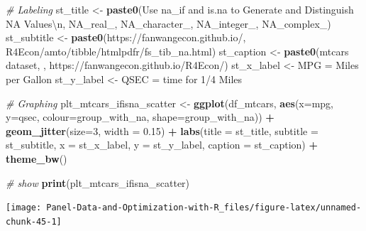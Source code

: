 \documentclass[
]{book}
\newenvironment{Shaded}{\begin{snugshade}}{\end{snugshade}}
\newcommand{\CharTok}[1]{\textcolor[rgb]{0.31,0.60,0.02}{#1}}
\newcommand{\CommentTok}[1]{\textcolor[rgb]{0.56,0.35,0.01}{\textit{#1}}}
\newcommand{\DataTypeTok}[1]{\textcolor[rgb]{0.13,0.29,0.53}{#1}}
\newcommand{\DecValTok}[1]{\textcolor[rgb]{0.00,0.00,0.81}{#1}}
\newcommand{\FloatTok}[1]{\textcolor[rgb]{0.00,0.00,0.81}{#1}}
\newcommand{\KeywordTok}[1]{\textcolor[rgb]{0.13,0.29,0.53}{\textbf{#1}}}
\newcommand{\NormalTok}[1]{#1}
\newcommand{\OperatorTok}[1]{\textcolor[rgb]{0.81,0.36,0.00}{\textbf{#1}}}
\newcommand{\StringTok}[1]{\textcolor[rgb]{0.31,0.60,0.02}{#1}}
\begin{document}
\begin{Shaded}
\begin{Highlighting}[]
\CommentTok{\# Labeling}
\NormalTok{st\_title \textless{}{-}}\StringTok{ }\KeywordTok{paste0}\NormalTok{(}\StringTok{\textquotesingle{}Use na\_if and is.na to Generate and Distinguish NA Values}\CharTok{\textbackslash{}n}\StringTok{\textquotesingle{}}\NormalTok{,}
                   \StringTok{\textquotesingle{}NA\_real\_, NA\_character\_, NA\_integer\_, NA\_complex\_\textquotesingle{}}\NormalTok{)}
\NormalTok{st\_subtitle \textless{}{-}}\StringTok{ }\KeywordTok{paste0}\NormalTok{(}\StringTok{\textquotesingle{}https://fanwangecon.github.io/\textquotesingle{}}\NormalTok{,}
                      \StringTok{\textquotesingle{}R4Econ/amto/tibble/htmlpdfr/fs\_tib\_na.html\textquotesingle{}}\NormalTok{)}
\NormalTok{st\_caption \textless{}{-}}\StringTok{ }\KeywordTok{paste0}\NormalTok{(}\StringTok{\textquotesingle{}mtcars dataset, \textquotesingle{}}\NormalTok{,}
                     \StringTok{\textquotesingle{}https://fanwangecon.github.io/R4Econ/\textquotesingle{}}\NormalTok{)}
\NormalTok{st\_x\_label \textless{}{-}}\StringTok{ \textquotesingle{}MPG = Miles per Gallon\textquotesingle{}}
\NormalTok{st\_y\_label \textless{}{-}}\StringTok{ \textquotesingle{}QSEC = time for 1/4 Miles\textquotesingle{}}

\CommentTok{\# Graphing}
\NormalTok{plt\_mtcars\_ifisna\_scatter \textless{}{-}}\StringTok{ }
\StringTok{  }\KeywordTok{ggplot}\NormalTok{(df\_mtcars, }
         \KeywordTok{aes}\NormalTok{(}\DataTypeTok{x=}\NormalTok{mpg, }\DataTypeTok{y=}\NormalTok{qsec, }
             \DataTypeTok{colour=}\NormalTok{group\_with\_na, }
             \DataTypeTok{shape=}\NormalTok{group\_with\_na)) }\OperatorTok{+}
\StringTok{  }\KeywordTok{geom\_jitter}\NormalTok{(}\DataTypeTok{size=}\DecValTok{3}\NormalTok{, }\DataTypeTok{width =} \FloatTok{0.15}\NormalTok{) }\OperatorTok{+}
\StringTok{  }\KeywordTok{labs}\NormalTok{(}\DataTypeTok{title =}\NormalTok{ st\_title, }\DataTypeTok{subtitle =}\NormalTok{ st\_subtitle,}
       \DataTypeTok{x =}\NormalTok{ st\_x\_label, }\DataTypeTok{y =}\NormalTok{ st\_y\_label, }\DataTypeTok{caption =}\NormalTok{ st\_caption) }\OperatorTok{+}
\StringTok{  }\KeywordTok{theme\_bw}\NormalTok{()}

\CommentTok{\# show}
\KeywordTok{print}\NormalTok{(plt\_mtcars\_ifisna\_scatter)}
\end{Highlighting}
\end{Shaded}

\begin{center}\texttt{[image: Panel-Data-and-Optimization-with-R\_files/figure-latex/unnamed-chunk-45-1]} \end{center}
\end{document}
